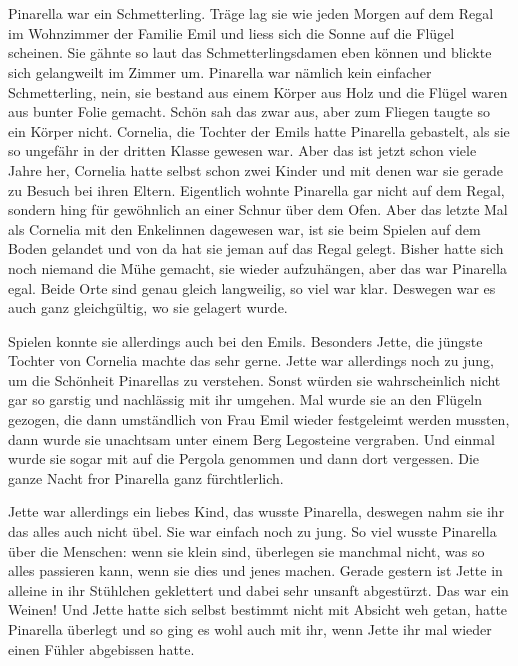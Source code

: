 \chapter*{}
\lettrine[lines=3]{\color{red}P}{}inarella war ein Schmetterling. Träge lag sie wie jeden Morgen auf dem Regal im Wohnzimmer der Familie Emil und liess sich die Sonne auf die Flügel scheinen. Sie gähnte so laut das Schmetterlingsdamen eben können und blickte sich gelangweilt im Zimmer um. Pinarella war nämlich kein einfacher Schmetterling, nein, sie bestand aus einem Körper aus Holz und die Flügel waren aus bunter Folie gemacht. Schön sah das zwar aus, aber zum Fliegen taugte so ein Körper nicht. Cornelia, die Tochter der Emils hatte Pinarella gebastelt, als sie so ungefähr in der dritten Klasse gewesen war. Aber das ist jetzt schon viele Jahre her, Cornelia hatte selbst schon zwei Kinder und mit denen war sie gerade zu Besuch bei ihren Eltern. Eigentlich wohnte Pinarella gar nicht auf dem Regal, sondern hing für gewöhnlich an einer Schnur über dem Ofen. Aber das letzte Mal als Cornelia mit den Enkelinnen dagewesen war, ist sie beim Spielen auf dem Boden gelandet und von da hat sie jeman auf das Regal gelegt. Bisher hatte sich noch niemand die Mühe gemacht, sie wieder aufzuhängen, aber das war Pinarella egal. Beide Orte sind genau gleich langweilig, so viel war klar. Deswegen war es auch ganz gleichgültig, wo sie gelagert wurde.


Spielen konnte sie allerdings auch bei den Emils. Besonders Jette, die jüngste Tochter von Cornelia machte das sehr gerne.  Jette war allerdings noch zu jung, um die Schönheit Pinarellas zu verstehen. Sonst würden sie wahrscheinlich nicht gar so garstig und nachlässig mit ihr umgehen. Mal wurde sie an den Flügeln gezogen, die dann umständlich von Frau Emil wieder festgeleimt werden mussten, dann wurde sie unachtsam unter einem Berg Legosteine vergraben. Und einmal wurde sie sogar mit auf die Pergola genommen und dann dort vergessen. Die ganze Nacht fror Pinarella ganz fürchtlerlich.

Jette war allerdings ein liebes Kind, das wusste Pinarella, deswegen nahm sie ihr das alles auch nicht übel. Sie war einfach noch zu jung. So viel wusste Pinarella über die Menschen: wenn sie klein sind, überlegen sie manchmal nicht, was so alles passieren kann, wenn sie dies und jenes machen. Gerade gestern ist Jette in alleine in ihr Stühlchen geklettert und dabei sehr unsanft abgestürzt. Das war ein Weinen! Und Jette hatte sich selbst bestimmt nicht mit Absicht weh getan, hatte Pinarella überlegt und so ging es wohl auch mit ihr, wenn Jette ihr mal wieder einen Fühler abgebissen hatte.

